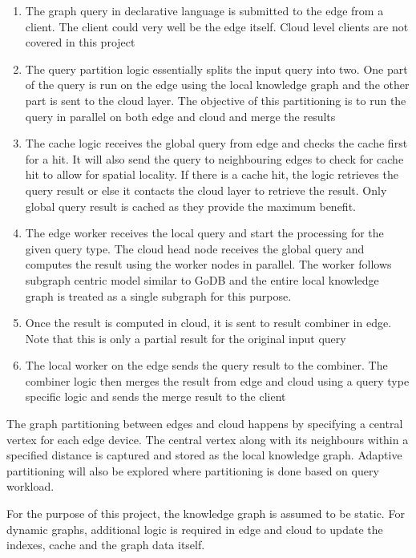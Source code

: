 \documentclass[conference]{IEEEtran}
\begin{document}
\begin{enumerate}%
	\item The graph query in declarative language is submitted to the edge from a client. The client could very well be the edge itself. Cloud level clients are not covered in this project
	\item The query partition logic essentially splits the input query into two. One part of the query is run on the edge using the local knowledge graph and the other part is sent to the cloud layer. The objective of this partitioning is to run the query in parallel on both edge and cloud and merge the results
	\item The cache logic receives the global query from edge and checks the cache first for a hit. It will also send the query to neighbouring edges to check for cache hit to allow for spatial locality. If there is a cache hit, the logic retrieves the query result or else it contacts the cloud layer to retrieve the result. Only global query result is cached as they provide the maximum benefit.
	\item The edge worker receives the local query and start the processing for the given query type. The cloud head node receives the global query and computes the result using the worker nodes in parallel. The worker follows subgraph centric model similar to GoDB and the entire local knowledge graph is treated as a single subgraph for this purpose. 
	\item Once the result is computed in cloud, it is sent to result combiner in edge. Note that this is only a partial result for the original input query
	\item The local worker on the edge sends the query result to the combiner. The combiner logic then merges the result from edge and cloud using a query type specific logic and sends the merge result to the client 
\end{enumerate}

The graph partitioning between edges and cloud happens by specifying a central vertex for each edge device. The central vertex along with its neighbours within a specified distance is captured and stored as the local knowledge graph. Adaptive partitioning will also be explored where partitioning is done based on query workload.

For the purpose of this project, the knowledge graph is assumed to be static. For dynamic graphs, additional logic is required in edge and cloud to update the indexes, cache and the graph data itself.
\end{document}
